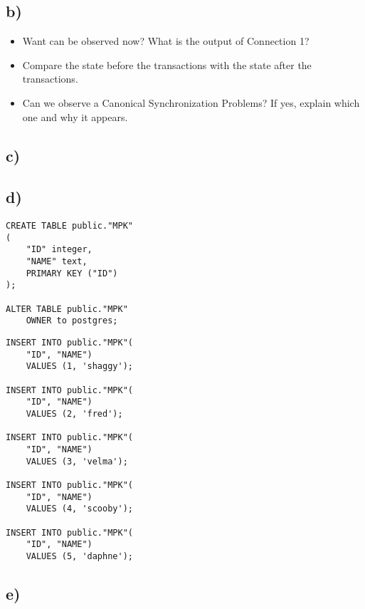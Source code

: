 \documentclass[ngerman]{dis-template-add}
\begin{document}
\subsection*{b)}

\begin{itemize}
\item Want can be observed now? What is the output of Connection 1?
\item Compare the state before the transactions with the state after the transactions.
\item Can we observe a Canonical Synchronization Problems? If yes, explain which one and why it appears.
\end{itemize}

\subsection*{c)}

\subsection*{d)}

\begin{verbatim}
CREATE TABLE public."MPK"
(
    "ID" integer,
    "NAME" text,
    PRIMARY KEY ("ID")
);

ALTER TABLE public."MPK"
    OWNER to postgres;
\end{verbatim}

\begin{verbatim}
INSERT INTO public."MPK"(
    "ID", "NAME")
    VALUES (1, 'shaggy');

INSERT INTO public."MPK"(
    "ID", "NAME")
    VALUES (2, 'fred');
	
INSERT INTO public."MPK"(
    "ID", "NAME")
    VALUES (3, 'velma');
	
INSERT INTO public."MPK"(
    "ID", "NAME")
    VALUES (4, 'scooby');
	
INSERT INTO public."MPK"(
    "ID", "NAME")
    VALUES (5, 'daphne');
\end{verbatim}


\subsection*{e)}
\end{document}
